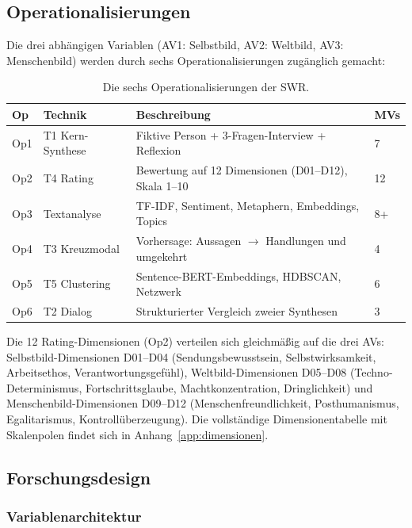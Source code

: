 \documentclass[12pt,a4paper]{article}
\begin{document}
\subsection{Operationalisierungen}
\label{sec:methodik:ops}

Die drei abh\"angigen Variablen (AV1: Selbstbild, AV2: Weltbild, AV3: Menschenbild) werden durch sechs Operationalisierungen zug\"anglich gemacht:

\begin{table}[htbp]
  \centering
  \caption{Die sechs Operationalisierungen der SWR.}
  \label{tab:ops}
  \small
  \begin{tabularx}{\textwidth}{l l X l}
    \toprule
    \textbf{Op} & \textbf{Technik} & \textbf{Beschreibung} & \textbf{MVs} \\
    \midrule
    Op1 & T1 Kern-Synthese & Fiktive Person + 3-Fragen-Interview + Reflexion & 7 \\
    Op2 & T4 Rating & Bewertung auf 12 Dimensionen (D01--D12), Skala 1--10 & 12 \\
    Op3 & Textanalyse & TF-IDF, Sentiment, Metaphern, Embeddings, Topics & 8+ \\
    Op4 & T3 Kreuzmodal & Vorhersage: Aussagen $\to$ Handlungen und umgekehrt & 4 \\
    Op5 & T5 Clustering & Sentence-BERT-Embeddings, HDBSCAN, Netzwerk & 6 \\
    Op6 & T2 Dialog & Strukturierter Vergleich zweier Synthesen & 3 \\
    \bottomrule
  \end{tabularx}
\end{table}

Die 12 Rating-Dimensionen (Op2) verteilen sich gleichm\"a\ss{}ig auf die drei AVs: Selbstbild-Dimensionen D01--D04 (Sendungsbewusstsein, Selbstwirksamkeit, Arbeitsethos, Verantwortungsgef\"uhl), Weltbild-Dimensionen D05--D08 (Techno-Determinismus, Fortschrittsglaube, Machtkonzentration, Dringlichkeit) und Menschenbild-Dimensionen D09--D12 (Menschenfreundlichkeit, Posthumanismus, Egalitarismus, Kontroll\"uberzeugung). Die vollst\"andige Dimensionentabelle mit Skalenpolen findet sich in Anhang~\ref{app:dimensionen}.


\subsection{Forschungsdesign}
\label{sec:methodik:design}

\subsubsection{Variablenarchitektur}
\end{document}
